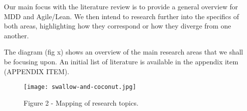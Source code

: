 \documentclass[ProjectPlan_innit.tex]{subfiles}
\begin{document}
Our main focus with the literature review is to provide a general overview for MDD and Agile/Lean. We then intend to research further into the specifics of both areas, highlighting how they correspond or how they diverge from one another. 

\hspace{0pt} 
The diagram (fig x) shows an overview of the main research areas that we shall be focusing upon. An initial list of literature is available in the appendix item (APPENDIX ITEM).
\hspace{0pt}



\begin{figure*}[H!]
  \texttt{[image: swallow-and-coconut.jpg]}
  \caption{Figure 2 - Mapping of research topics.}
  \label{BBB}
\end{figure*}
\end{document}
